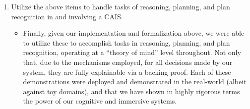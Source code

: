 \begin{enumerate}
    \item Utilize the above items to handle tasks of reasoning, planning, and plan recognition
        in and involving a CAIS.
    
    \begin{itemize}
        \item[] Finally, given our implementation and formalization above, we were able to utilize
        these to accomplish tasks in reasoning, planning, and plan recognition, operating at a
        ``theory of mind'' level throughout. Not only that, due to the mechanisms employed, for all
        decisions made by our system, they are fully explainable via a backing proof. Each of these
        demonstrations were deployed and demonstrated in the real-world (albeit against toy domains),
        and that we have shown in highly rigorous terms the power of our cognitive and immersive systems.
    \end{itemize}
\end{enumerate}